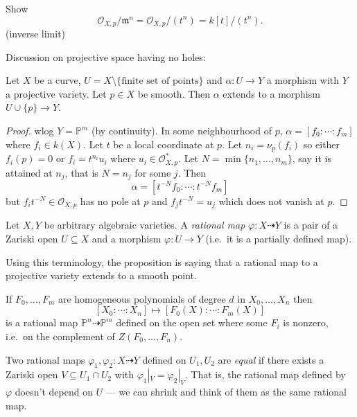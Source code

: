 \documentclass[a4paper]{article}
\renewcommand*{\P}{\mathbb{P}}
\newcommand{\rational}{\dashrightarrow} %
\begin{document}
\begin{ex}
  Show
  \[
    \mathcal O_{X, p} / \mathfrak m^n = \mathcal O_{X, p}/(t^n) = k[t]/(t^n).
  \]
  (inverse limit)
\end{ex}

Discussion on projective space having no holes:
\begin{proposition}
  Let \(X\) be a curve, \(U = X \setminus \{\text{finite set of points}\}\) and \(\alpha: U \to Y\) a morphism with \(Y\) a projective variety. Let \(p \in X\) be smooth. Then \(\alpha\) extends to a morphism \(U \cup \{p\} \to Y\).
\end{proposition}

\begin{proof}
  wlog \(Y = \P^m\) (by continuity). In some neighbourhood of \(p\), \(\alpha = [f_0: \cdots: f_m]\) where \(f_i \in k(X)\). Let \(t\) be a local coordinate at \(p\). Let \(n_i = \nu_p(f_i)\) so either \(f_i(p) = 0\) or \(f_i = t^{n_i} u_i\) where \(u_i \in \mathcal O_{X, p}^*\). Let \(N = \min \{n_1, \dots, n_m\}\), say it is attained at \(n_j\), that is \(N = n_j\) for some \(j\). Then
  \[
    \alpha = [t^{-N} f_0: \cdots :t^{-N} f_m]
  \]
  but \(f_i t^{-N} \in \mathcal O_{X, p}\) has no pole at \(p\) and \(f_j t^{-N} = u_j\) which does not vanish at \(p\).
\end{proof}

\begin{definition}
  Let \(X, Y\) be arbitrary algebraic varieties. A \emph{rational map} \(\varphi: X \rational Y\) is a pair of a Zariski open \(U \subseteq X\) and a morphism \(\varphi: U \to Y\) (i.e.\ it is a partially defined map).
\end{definition}

Using this terminology, the proposition is saying that a rational map to a projective variety extends to a smooth point.

\begin{eg}
  If \(F_0, \dots, F_m\) are homogeneous polynomials of degree \(d\) in \(X_0, \dots, X_n\) then
  \[
    [X_0: \cdots : X_n] \mapsto [F_0(X): \cdots : F_m(X)]
  \]
  is a rational map \(\P^n \rational \P^m\) defined on the open set where some \(F_i\) is nonzero, i.e.\ on the complement of \(Z(F_0, \dots, F_n)\).
\end{eg}

\begin{definition}
  Two rational maps \(\varphi_1, \varphi_2: X \rational Y\) defined on \(U_1, U_2\) are \emph{equal} if there exists a Zariski open \(V \subseteq U_1 \cap U_2\) with \(\varphi_1|_V = \varphi_2|_V\). That is, the rational map defined by \(\varphi\) doesn't depend on \(U\) --- we can shrink and think of them as the same rational map.
\end{definition}
\end{document}
